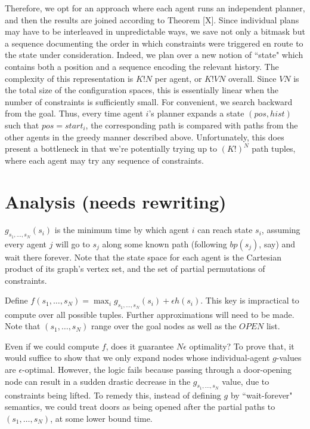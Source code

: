 \documentclass[letterpaper]{article}
\begin{document}
Therefore, we opt for an approach where each agent runs an independent planner, and then the results are joined according to Theorem [X]. Since individual plans may have to be interleaved in unpredictable ways, we save not only a bitmask but a sequence documenting the order in which constraints were triggered en route to the state under consideration. Indeed, we plan over a new notion of ``state" which contains both a position and a sequence encoding the relevant history. The complexity of this representation is $K!N$ per agent, or $K!VN$ overall. Since $VN$ is the total size of the configuration spaces, this is essentially linear when the number of constraints is sufficiently small. For convenient, we search backward from the goal. Thus, every time agent $i$'s planner expands a state $(pos, hist)$ such that $pos = start_i$, the corresponding path is compared with paths from the other agents in the greedy manner described above. Unfortunately, this does present a bottleneck in that we're potentially trying up to $(K!)^N$ path tuples, where each agent may try any sequence of constraints.

\section{Analysis (needs rewriting)}

$g_{s_1,\ldots,s_N}(s_i)$ is the minimum time by which agent $i$ can reach state $s_i$, assuming every agent $j$ will go to $s_j$ along some known path (following $bp(s_j)$, say) and wait there forever. Note that the state space for each agent is the Cartesian product of its graph's vertex set, and the set of partial permutations of constraints.

Define $f(s_1,\ldots,s_N) = \max_i g_{s_1,\ldots,s_N}(s_i) + \epsilon h(s_i)$. This key is impractical to compute over all possible tuples. Further approximations will need to be made. Note that $(s_1,\ldots,s_N)$ range over the goal nodes as well as the $OPEN$ list.

Even if we could compute $f$, does it guarantee $N\epsilon$ optimality? To prove that, it would suffice to show that we only expand nodes whose individual-agent $g$-values are $\epsilon$-optimal. However, the logic fails because passing through a door-opening node can result in a sudden drastic decrease in the $g_{s_1,\ldots,s_N}$ value, due to constraints being lifted. To remedy this, instead of defining $g$ by ``wait-forever" semantics, we could treat doors as being opened after the partial paths to $(s_1,\ldots,s_N)$, at some lower bound time.
\end{document}
